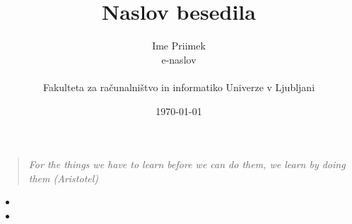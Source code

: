 \documentclass[11pt,a4paper]{article}
\title{Naslov besedila}
\author{Ime Priimek\\
e-naslov\\
\ \\
Fakulteta za računalništvo in informatiko Univerze v Ljubljani
\date{\today}         
}
\begin{document}
\maketitle


\begin{quote}
\textit{For the things we have to learn before we can do them, we learn by doing them (Aristotel)}
\end{quote}


\begin{itemize}
\item

\item

\end{itemize}
\end{document}
